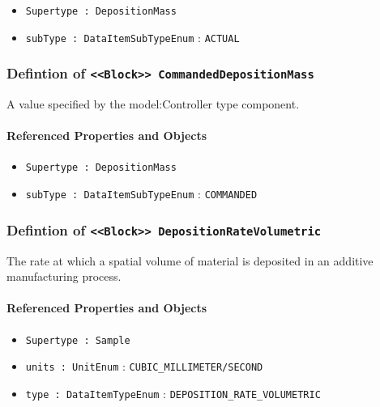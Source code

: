\begin{itemize}
\item \texttt{Supertype : DepositionMass}

\item \texttt{subType : DataItemSubTypeEnum} : \texttt{ACTUAL}

\end{itemize}
\FloatBarrier
\subsubsection{Defintion of \texttt{<<Block>> CommandedDepositionMass}}
  \label{type:CommandedDepositionMass}

\FloatBarrier

A value specified by the {model:Controller} type component.

\FloatBarrier
\paragraph{Referenced Properties and Objects}

\begin{itemize}
\item \texttt{Supertype : DepositionMass}

\item \texttt{subType : DataItemSubTypeEnum} : \texttt{COMMANDED}

\end{itemize}
\FloatBarrier
\subsubsection{Defintion of \texttt{<<Block>> DepositionRateVolumetric}}
  \label{type:DepositionRateVolumetric}

\FloatBarrier

The rate at which a spatial volume of material is deposited in an additive manufacturing process.

\FloatBarrier
\paragraph{Referenced Properties and Objects}

\begin{itemize}
\item \texttt{Supertype : Sample}

\item \texttt{units : UnitEnum} : \texttt{CUBIC_MILLIMETER/SECOND}

\item \texttt{type : DataItemTypeEnum} : \texttt{DEPOSITION_RATE_VOLUMETRIC}

\end{itemize}
\FloatBarrier
